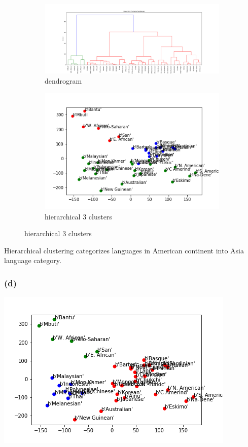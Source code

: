 \documentclass[12pt]{article}
\begin{document}
{\begin{figure}
\centering
\begin{subfigure}{.49\textwidth}
  \centering
  \includegraphics[width=1\linewidth]{P4/dendrogram.png}
  \caption{dendrogram}
\end{subfigure}
\begin{subfigure}{.49\textwidth}
  \centering
  \includegraphics[width=1\linewidth]{P4/hierarchical_3_clusters.png}
  \caption{hierarchical 3 clusters}
\end{subfigure}
\end{figure}
Hierarchical clustering categorizes languages in American continent into Asia language category.

\subsubsection*{(d)}

\includegraphics[scale=1]{P4/3-medoids.png}

}
\end{document}
